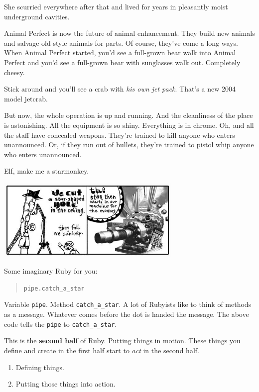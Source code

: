\documentclass[10pt,twoside]{report}
\begin{document}
She scurried everywhere after that and lived for years in pleasantly
moist underground cavities.

Animal Perfect is now the future of animal enhancement.  They build
new animals and salvage old-style animals for parts.  Of course,
they've come a long ways. When Animal Perfect started, you'd see a
full-grown bear walk into Animal Perfect and you'd see a full-grown
bear with sunglasses walk out.  Completely cheesy.

Stick around and you'll see a crab with {\em his own jet pack}.
That's a new 2004 model jetcrab.

But now, the whole operation is up and running.  And the cleanliness
of the place is astonishing. All the equipment is so shiny.
Everything is in chrome.  Oh, and all the staff have concealed
weapons.  They're trained to kill anyone who enters unannounced.  Or,
if they run out of bullets, they're trained to pistol whip anyone who
enters unannounced.

Elf, make me a starmonkey.

	\includegraphics[width=0.66625\textwidth]{cache/24.png}

Some imaginary Ruby for you:

\begin{quote}
\lstinline[breaklines=true]|pipe.catch_a_star|\end{quote}


Variable \lstinline[breaklines=true]|pipe|.  Method
\lstinline[breaklines=true]|catch_a_star|.  A lot of Rubyists like to
think of methods as a message. Whatever comes before the dot is handed
the message.  The above code tells the
\lstinline[breaklines=true]|pipe| to
\lstinline[breaklines=true]|catch_a_star|.

This is the {\bf second half} of Ruby.  Putting things in motion.
These things you define and create in the first half start to {\em
  act} in the second half.

\begin{enumerate}
\item Defining things.
\item Putting those things into action.
\end{enumerate}
\end{document}
